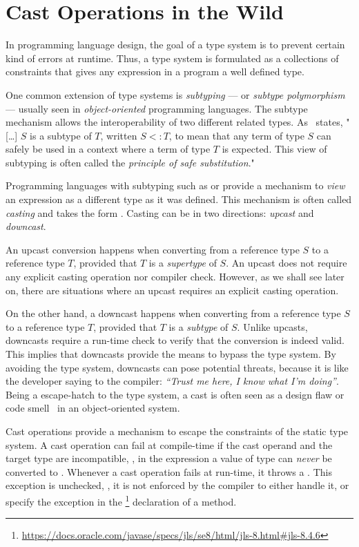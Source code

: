 
\chapter{Cast Operations in the Wild}
\label{cha:casts}

In programming language design, the goal of a type system is to prevent certain kind of errors at runtime.
Thus, a type system is formulated as a collections of constraints that gives any expression in a program a well defined type.

One common extension of type systems is \emph{subtyping} --- or \emph{subtype polymorphism} --- usually seen in \emph{object-oriented} programming languages.
The subtype mechanism allows the interoperability of two different related types.
As~\cite{pierceTypesProgrammingLanguages2002} states, "[\ldots] $S$ is a subtype of $T$, written $S <: T$, to mean that any term of type $S$ can safely be used in a context where a term of type $T$ is expected.
This view of subtyping is often called the \emph{principle of safe substitution}."

Programming languages with subtyping such as \java{} or \cpp{} provide a mechanism to \emph{view} an expression as a different type as it was defined.
This mechanism is often called \emph{casting} and takes the form .
Casting can be in two directions: \emph{upcast} and \emph{downcast}.

An upcast conversion happens when converting from a reference type $S$ to a reference type $T$, provided that $T$ is a \emph{supertype} of $S$.
An upcast does not require any explicit casting operation nor compiler check.
However, as we shall see later on, there are situations where an upcast requires an explicit casting operation.

On the other hand, a downcast happens when converting from a reference type $S$ to a reference type $T$, provided that $T$ is a \emph{subtype} of $S$.
Unlike upcasts, downcasts require a run-time check to verify that the conversion is indeed valid.
This implies that downcasts provide the means to bypass the type system.
By avoiding the type system, downcasts can pose potential threats, because it is like the developer saying to the compiler: \emph{``Trust me here, I know what I'm doing''}.
Being a escape-hatch to the type system, a cast is often seen as a design flaw or code smell~\citep{tufanoWhenWhyYour2015} in an object-oriented system.

Cast operations provide a mechanism to escape the constraints of the static type system.
A cast operation can fail at compile-time if the cast operand and the target type are incompatible,
\eg, in the expression  a value of type  can \emph{never} be converted to .
Whenever a cast operation fails at run-time, it throws a .
This exception is unchecked, \ie,
it is not enforced by the compiler to either handle it, or
specify the exception in the %
\footnote{\url{https://docs.oracle.com/javase/specs/jls/se8/html/jls-8.html\#jls-8.4.6}}
declaration of a method.



